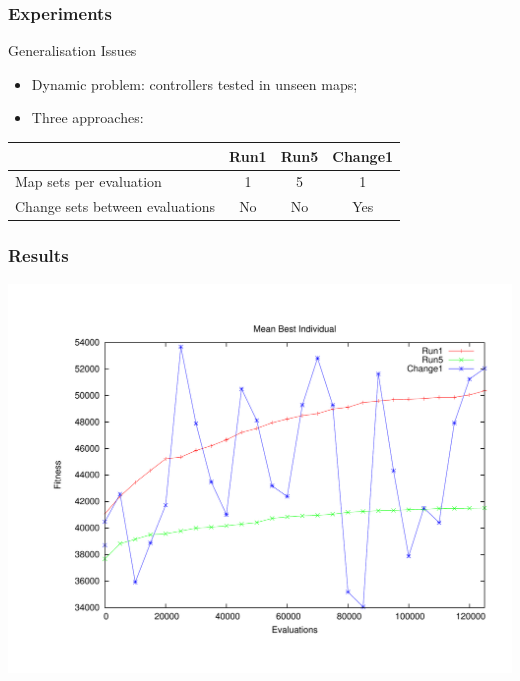 \documentclass{beamer}
\begin{document}
\begin{frame}
	\frametitle{Experiments}
	\begin{block}{Generalisation Issues}
		\begin{itemize}
			\item Dynamic problem: controllers tested in unseen maps;
			\item Three approaches:
		\end{itemize}
		\begin{center}
			\scriptsize{\begin{tabular}{|l|c|c|c|}
				\cline{2-4}
				\multicolumn{1}{c|}{}& \textbf{Run1} & \textbf{Run5} & \textbf{Change1}\\
				\hline
				Map sets per evaluation& 1 & 5 & 1 \\
				\hline
				Change sets between evaluations & No & No & Yes \\
				\hline
			\end{tabular}}
		\end{center}
	\end{block}
	\vfill
\end{frame}

\begin{frame}
	\frametitle{Results}
	\begin{center}
		\includegraphics[width=.75\paperwidth]{mbi}
	\end{center}
	\vfill
\end{frame}
\end{document}
